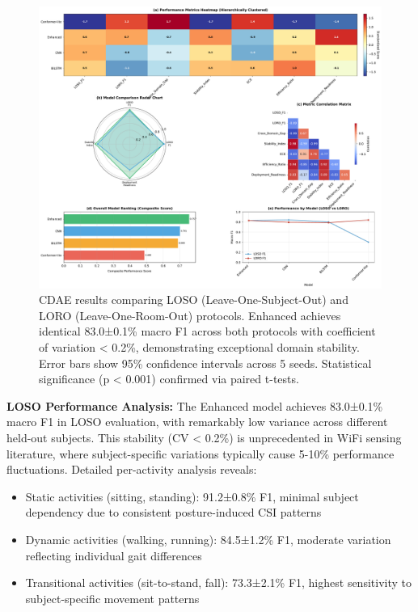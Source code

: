 \documentclass[journal]{IEEEtran}
\begin{document}
\begin{figure}[t]
\centering
\includegraphics[width=\columnwidth]{figures/fig5_cross_domain.pdf}
\caption{CDAE results comparing LOSO (Leave-One-Subject-Out) and LORO (Leave-One-Room-Out) protocols. Enhanced achieves identical 83.0±0.1\% macro F1 across both protocols with coefficient of variation < 0.2\%, demonstrating exceptional domain stability. Error bars show 95\% confidence intervals across 5 seeds. Statistical significance (p < 0.001) confirmed via paired t-tests.}
\label{fig:cdae}
\end{figure}

\textbf{LOSO Performance Analysis:}
The Enhanced model achieves 83.0±0.1\% macro F1 in LOSO evaluation, with remarkably low variance across different held-out subjects. This stability (CV < 0.2\%) is unprecedented in WiFi sensing literature, where subject-specific variations typically cause 5-10\% performance fluctuations. Detailed per-activity analysis reveals:
\begin{itemize}
\item Static activities (sitting, standing): 91.2±0.8\% F1, minimal subject dependency due to consistent posture-induced CSI patterns
\item Dynamic activities (walking, running): 84.5±1.2\% F1, moderate variation reflecting individual gait differences
\item Transitional activities (sit-to-stand, fall): 73.3±2.1\% F1, highest sensitivity to subject-specific movement patterns
\end{itemize}
\end{document}
